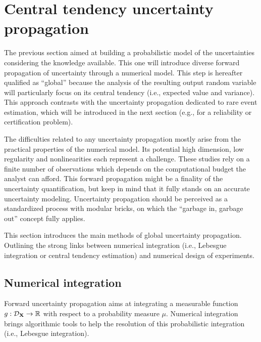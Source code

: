 \section{Central tendency uncertainty propagation}

The previous section aimed at building a probabilistic model of the uncertainties considering the knowledge available.
This one will introduce diverse forward propagation of uncertainty through a numerical model. 
This step is hereafter qualified as ``global'' because the analysis of the resulting output random variable will particularly focus on its central tendency (i.e., expected value and variance).
This approach contrasts with the uncertainty propagation dedicated to rare event estimation, which will be introduced in the next section (e.g., for a reliability or certification problem).

The difficulties related to any uncertainty propagation mostly arise from the practical properties of the numerical model. 
Its potential high dimension, low regularity and nonlinearities each represent a challenge. 
These studies rely on a finite number of observations which depends on the computational budget the analyst can afford.   
This forward propagation might be a finality of the uncertainty quantification, but keep in mind that it fully stands on an accurate uncertainty modeling.
Uncertainty propagation should be perceived as a standardized process with modular bricks, on which the ``garbage in, garbage out'' concept fully applies.

This section introduces the main methods of global uncertainty propagation. 
Outlining the strong links between numerical integration (i.e., Lebesgue integration or central tendency estimation) and numerical design of experiments. 


\subsection{Numerical integration}

Forward uncertainty propagation aims at integrating a measurable function $g: \mathcal{D}_{{\bf X}} \rightarrow \mathbb{R}$ with respect to a probability measure $\mu$.
Numerical integration brings algorithmic tools to help the resolution of this probabilistic integration (i.e., Lebesgue integration). 

